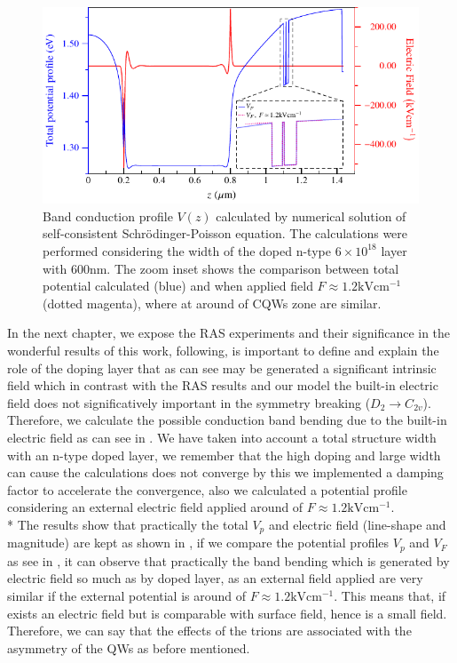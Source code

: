 \begin{figure}[ht!]
	\centering
	\includegraphics[width=\textwidth]{../figures/chapter-3/poisson/build/poisson-3.pdf}
	\caption{Band conduction profile $V(z)$ calculated by numerical solution of self-consistent Schr\"odinger-Poisson equation. The calculations were performed considering the width of the doped n-type $6\times 10^{18}$ layer with  600nm. The zoom inset shows the comparison between total potential calculated (blue) and when applied field $F\!\approx\! 1.2 \mathrm{kVcm^{-1}}$ (dotted magenta), where at around of CQWs zone are similar.}
	\label{fig:chapter-3-pr-poisson-3}
\end{figure}
In the next chapter, we expose the RAS experiments and their significance in the wonderful results of this work, following, is important to define and explain the role of the doping layer that as can see may be generated a significant intrinsic field which in contrast with the RAS results and our model the built-in electric field does not significatively important in the symmetry breaking ($D_{2} \to C_{2v}$).  Therefore, we calculate the possible conduction band bending due to the built-in electric field as can see in .
We have taken into account a total structure width with an n-type doped layer,  we remember that the high doping and large width can cause the calculations does not converge by this we implemented a damping factor to accelerate the convergence, also we calculated a  potential profile considering an external electric field applied around of $F\!\approx\! 1.2 \mathrm{kVcm^{-1}}$. \\*
The results show that practically the total $V_p$ and electric field (line-shape and magnitude) are kept as shown in , if we compare the potential profiles $V_{p}$ and $V_{F}$ as see in , it can observe that practically the band bending which is generated by electric field so much as by doped layer, as an external field applied are very similar if the external potential is around of $F\!\approx\! 1.2 \mathrm{kVcm^{-1}}$. This means that, if exists an electric field but is comparable with surface field\cite{lastras1999model}, hence is a small field. 
Therefore, we can say that the effects of the trions are associated with the asymmetry of the \gls{QW}s as before mentioned.



